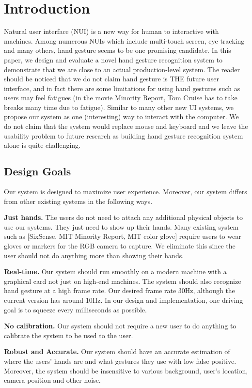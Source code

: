 \section{Introduction}
Natural user interface (NUI) is a new way for human to interactive with machines. Among numerous NUIs which include multi-touch screen, eye tracking and many others, hand gesture seems to be one promising candidate. In this paper, we design and evaluate a novel hand gesture recognition system to demonstrate that we are close to an actual production-level system. The reader should be noticed that we do not claim hand gesture is THE future user interface, and in fact there are some limitations for using hand gestures such as users may feel fatigues (in the movie Minority Report, Tom Cruise has to take breaks many time due to fatigue). Similar to many other new UI systems, we propose our system as one (interesting) way to interact with the computer. We do not claim that the system would replace mouse and keyboard and we leave the usability problem to future research as building hand gesture recognition system alone is quite challenging. 


\subsection{Design Goals}
Our system is designed to maximize user experience. Moreover, our system differs from other existing systems in the following ways.

\textbf{Just hands.} The users do not need to attach any additional physical objects to use our systems. They just need to show up their hands. Many existing system such as [SixSense, MIT Minority Report, MIT color glove] require users to wear gloves or markers  for the RGB camera to capture. We eliminate this since the user should not do anything more than showing their hands. 
  
\textbf{Real-time.} Our system should run smoothly on a modern machine with a graphical card not just on high-end machines. The system should also recognize hand gesture at a high frame rate. Our desired frame rate 30Hz, although the current version has around 10Hz. In our design and implementation, one driving goal is to squeeze every milliseconds as possible. 

\textbf{No calibration.} Our system should not require a new user to do anything to calibrate the system to be used to the user. 

\textbf{Robust and Accurate.} Our system should have an accurate estimation of where the users' hands are and what gestures they use with low false positive. Moreover, the system should be insensitive to various background, user's location, camera position and other noise. 
  
